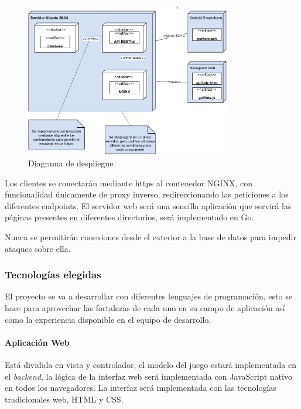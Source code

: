 \documentclass{article}
\begin{document}
\begin{figure}[htb]
    \centering
    \includegraphics[width=0.8\textwidth]{../images/diagrama_despliegue.pdf}
    \caption{Diagrama de despliegue}
    \label{fig:diag_despliegue}
\end{figure}

Los clientes se conectarán mediante https al contenedor NGINX, con funcionalidad
únicamente de proxy inverso, redireccionando las peticiones a los diferentes endpoints.
El servidor web será una sencilla aplicación que servirá las páginas presentes
en diferentes directorios, será implementado en Go.

Nunca se permitirán conexiones desde el exterior a la base de datos para impedir ataques sobre ella. 

\FloatBarrier
\subsubsection{Tecnologías elegidas}

El proyecto se va a desarrollar con diferentes lenguajes de programación, esto se hace para aprovechar las 
fortalezas de cada uno en su campo de aplicación así como la experiencia disponible en el equipo de desarrollo.


\paragraph*{Aplicación Web}

Está dividida en vista y controlador, el modelo del juego estará implementada en el \textit{backend}, 
la lógica de la interfaz web será implementada con JavaScript nativo en todos los navegadores. 
La interfaz será implementada con las tecnologías tradicionales web, HTML y CSS.
\end{document}
